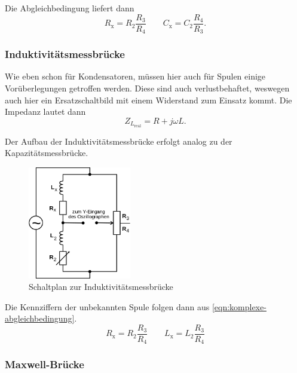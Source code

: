 Die Abgleichbedingung liefert dann
\begin{equation}
	R_\text{x} = R_2 \frac{R_3}{R_4}
	\qquad
	C_\text{x} = C_2 \frac{R_4}{R_3}.
	\label{eqn:values-kapazitaeten}
\end{equation}

\subsubsection{Induktivitätsmessbrücke}
\label{sec:theorie-induktivitätsmessbrücke}

Wie eben schon für Kondensatoren, müssen hier auch für Spulen einige Vorüberlegungen getroffen werden.
Diese sind auch verlustbehaftet, weswegen auch hier ein Ersatzschaltbild mit einem Widerstand zum Einsatz kommt.
Die Impedanz lautet dann
\begin{equation}
	Z_{L_\text{real}} = R + j \omega L.
	\label{eqn:reale-induktivitaet}
\end{equation}

Der Aufbau der Induktivitätsmessbrücke erfolgt analog zu der Kapazitätsmessbrücke.
\begin{figure}[H]
	\centering
	\includegraphics[width=0.4\textwidth]{bilder/induktivitaetsbruecke.png}
	\caption{Schaltplan zur Induktivitätsmessbrücke \cite{sample}}
	\label{fig:induktivitaetsbruecke}
\end{figure}

Die Kennziffern der unbekannten Spule folgen dann aus \autoref{eqn:komplexe-abgleichbedingung}.
\begin{equation}
	R_\text{x} = R_2 \frac{R_3}{R_4}
	\qquad
	L_\text{x} = L_2 \frac{R_3}{R_4}
	\label{eqn:values-induktivitaetsbruecke}
\end{equation}


\subsubsection{Maxwell-Brücke}
\label{sec:theorie-maxwell-bruecke}

